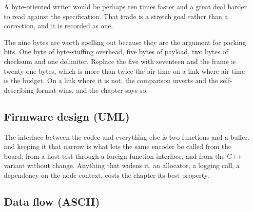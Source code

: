 A byte-oriented writer would be perhaps ten times faster and a great deal harder to
read against the specification. That trade is a stretch goal rather than a
correction, and it is recorded as one.


The nine bytes are worth spelling out because they are the argument for packing
bits. One byte of byte-stuffing overhead, five bytes of payload, two bytes of
checksum and one delimiter. Replace the five with seventeen and the frame is
twenty-one bytes, which is more than twice the air time on a link where air
time is the budget. On a link where it is not, the comparison inverts and the
self-describing format wins, and the chapter says so.

\subsection*{Firmware design (UML)}


The interface between the codec and everything else is two functions and a
buffer, and keeping it that narrow is what lets the same encoder be called from
the board, from a host test through a foreign function interface, and from the
C++ variant without change. Anything that widens it, an allocator, a logging
call, a dependency on the node context, costs the chapter its best property.

\subsection*{Data flow (ASCII)}

